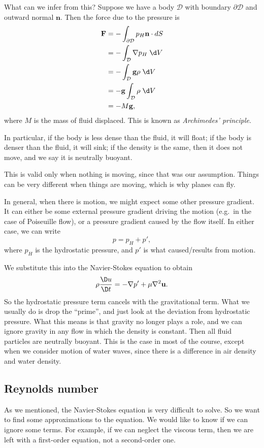 \documentclass[a4paper]{article}
\begin{document}
What can we infer from this? Suppose we have a body $\mathcal{D}$ with boundary $\partial \mathcal{D}$ and outward normal $\mathbf{n}$. Then the force due to the pressure is
\begin{align*}
  \mathbf{F} &= - \int_{\partial \mathcal{D}} p_H \mathbf{n}\cdot dS \\
  &= - \int_\mathcal{D} \nabla p_H \;\d V\\
  &= - \int_{\mathcal{D}} \mathbf{g} \rho \;\d V\\
  &= - \mathbf{g} \int_\mathcal{D} \rho \;\d V\\
  &= - M\mathbf{g},
\end{align*}
where $M$ is the mass of fluid displaced. This is known as \emph{Archimedes' principle}.

In particular, if the body is less dense than the fluid, it will float; if the body is denser than the fluid, it will sink; if the density is the same, then it does not move, and we say it is neutrally buoyant.

This is valid only when nothing is moving, since that was our assumption. Things can be very different when things are moving, which is why planes can fly.

In general, when there is motion, we might expect some other pressure gradient. It can either be some external pressure gradient driving the motion (e.g.\ in the case of Poiseuille flow), or a pressure gradient caused by the flow itself. In either case, we can write
\[
  p = p_H + p',
\]
where $p_H$ is the hydrostatic pressure, and $p'$ is what caused/results from motion.

We substitute this into the Navier-Stokes equation to obtain
\[
  \rho \frac{\D u}{\D t} = -\nabla p' + \mu \nabla^2 \mathbf{u}.
\]
So the hydrostatic pressure term cancels with the gravitational term. What we usually do is drop the ``prime'', and just look at the deviation from hydrostatic pressure. What this means is that gravity no longer plays a role, and we can ignore gravity in any flow in which the density is constant. Then all fluid particles are neutrally buoyant. This is the case in most of the course, except when we consider motion of water waves, since there is a difference in air density and water density.

\subsection{Reynolds number}
As we mentioned, the Navier-Stokes equation is very difficult to solve. So we want to find some approximations to the equation. We would like to know if we can ignore some terms. For example, if we can neglect the viscous term, then we are left with a first-order equation, not a second-order one.
\end{document}

